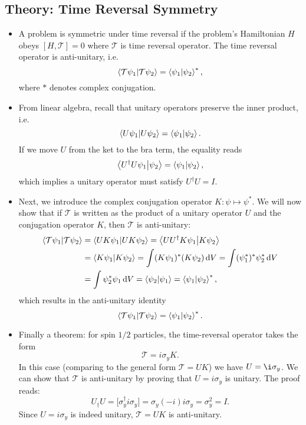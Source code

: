 \documentclass[11pt, a4paper]{article}
\newcommand{\diff}{\mathop{}\!\mathrm{d}} %
\newcommand{\T}{\mathcal{T}}  %
\newcommand{\bbraket}[2]{\big \langle {#1} \big | {#2} \big \rangle}  %
\begin{document}
\subsection{Theory: Time Reversal Symmetry}
\begin{itemize}
	\item A problem is symmetric under time reversal if the problem's Hamiltonian $ H $ obeys $ [H, \T] = 0 $ where $ \T $ is time reversal operator. The time reversal operator is anti-unitary, i.e.
	\begin{equation*}
		\braket{\T\psi_{1}}{\T\psi_{2}} = \braket{\psi_{1}}{\psi_{2}}^{*},
	\end{equation*}
	where $ * $ denotes complex conjugation.
	
	\item From linear algebra, recall that unitary operators preserve the inner product, i.e.
	\begin{equation*}
		\braket{U\psi_{1}}{U\psi_{2}} = \braket{\psi_{1}}{\psi_{2}}.
	\end{equation*}
	If we move $ U $ from the ket to the bra term, the equality reads
	\begin{equation*}
		\bbraket{U^{\dagger}U\psi_{1}}{\psi_{2}} = \braket{\psi_{1}}{\psi_{2}},
	\end{equation*}
	which implies a unitary operator must satisfy $ U^{\dagger}U = I $.
	
	\item Next, we introduce the complex conjugation operator $ K: \psi \mapsto \psi^{*} $. We will now show that if $ \T $ is written as the product of a unitary operator $ U $ and the conjugation operator $ K $, then $ \T $ is anti-unitary:
	\begin{align*}
		\braket{\T\psi_{1}}{\T\psi_{2}} &= \braket{UK\psi_{1}}{UK\psi_{2}} = \bbraket{UU^{\dagger}K\psi_{1}}{K\psi_{2}}\\
		&= \braket{K\psi_{1}}{K\psi_{2}} = \int (K\psi_{1})^{*} (K\psi_{2})\diff V = \int (\psi_{1}^{*})^{*}\psi_{2}^{*}\diff V\\
		&= \int \psi_{2}^{*}\psi_{1}\diff V = \braket{\psi_{2}}{\psi_{1}} = \braket{\psi_{1}}{\psi_{2}}^{*},
	\end{align*}
	which results in the anti-unitary identity 
	\begin{equation*}
		\braket{\T\psi_{1}}{\T\psi_{2}} = \braket{\psi_{1}}{\psi_{2}}^{*}.
	\end{equation*}
	
	\item Finally a theorem: for spin $ 1/2 $ particles, the time-reversal operator takes the form
	\begin{equation*}
		\T = i\sigma_{y}K.
	\end{equation*}
	In this case (comparing to the general form $ \T = UK $) we have $ U = \i \sigma_{y} $. We can show that $ \T $ is anti-unitary by proving that $ U = i \sigma_{y} $ is unitary. The proof reads:
	\begin{equation*}
		U_{\dagger}U = \big[\sigma_{y}^{\dagger} i \sigma_{y}\big] = \sigma_{y} (-i) i \sigma_{y} = \sigma_{y}^{2} = I.
	\end{equation*}
	Since $ U = i \sigma_{y} $ is indeed unitary, $ \T = UK $ is anti-unitary.
\end{itemize}
	
\end{document}

